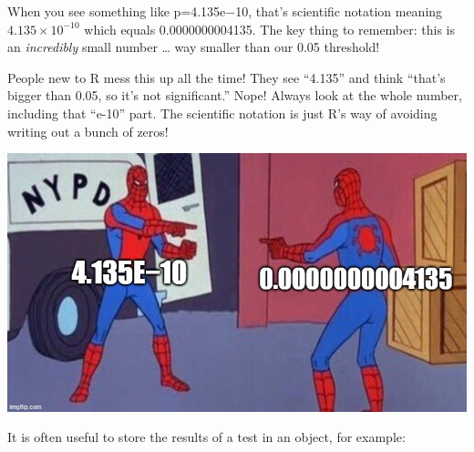 \documentclass[
  letterpaper,
]{book}
\newenvironment{Shaded}{\begin{snugshade}}{\end{snugshade}}
\newcommand{\AttributeTok}[1]{\textcolor[rgb]{0.40,0.45,0.13}{#1}}
\newcommand{\DecValTok}[1]{\textcolor[rgb]{0.68,0.00,0.00}{#1}}
\newcommand{\FunctionTok}[1]{\textcolor[rgb]{0.28,0.35,0.67}{#1}}
\newcommand{\NormalTok}[1]{\textcolor[rgb]{0.00,0.23,0.31}{#1}}
\newcommand{\OtherTok}[1]{\textcolor[rgb]{0.00,0.23,0.31}{#1}}
\newcommand{\SpecialCharTok}[1]{\textcolor[rgb]{0.37,0.37,0.37}{#1}}
\newcommand{\StringTok}[1]{\textcolor[rgb]{0.13,0.47,0.30}{#1}}
\begin{document}
\begin{tcolorbox}[enhanced jigsaw, colframe=quarto-callout-tip-color-frame, breakable, arc=.35mm, bottomtitle=1mm, bottomrule=.15mm, colbacktitle=quarto-callout-tip-color!10!white, rightrule=.15mm, colback=white, opacityback=0, opacitybacktitle=0.6, coltitle=black, left=2mm, toptitle=1mm, toprule=.15mm, titlerule=0mm, leftrule=.75mm, title=\textcolor{quarto-callout-tip-color}{\faLightbulb}\hspace{0.5em}{Tip from the Helpdesk: Scientific Notation - Don't Miss the Forest for
the Trees}]

When you see something like p=4.135e−10, that's scientific notation
meaning \(4.135 \times 10^{-10}\) which equals 0.0000000004135. The key
thing to remember: this is an \emph{incredibly} small number \ldots{}
way smaller than our 0.05 threshold!

People new to R mess this up all the time! They see ``4.135'' and think
``that's bigger than 0.05, so it's not significant.'' Nope! Always look
at the whole number, including that ``e-10'' part. The scientific
notation is just R's way of avoiding writing out a bunch of zeros!

\begin{center}
\includegraphics[width=0.7\linewidth,height=\textheight,keepaspectratio]{images/scientific_spidey.jpg}
\end{center}

\end{tcolorbox}

It is often useful to store the results of a test in an object, for
example:

\begin{Shaded}
\end{Shaded}
\end{document}
